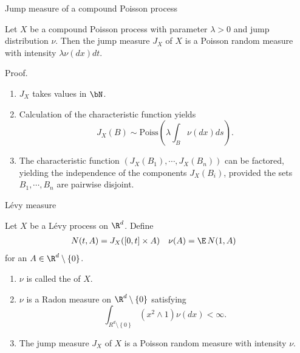 \begin{frame}
    {Jump measure of a compound Poisson process}
    
    \begin{theorem}
        Let $X$ be a compound Poisson process with parameter $\lambda>0$ and jump
        distribution $\nu$. Then the jump measure $J_X$ of $X$ is a Poisson 
        random measure with intensity $\lambda \nu(dx) dt$.
    \end{theorem}

    Proof.
    \begin{enumerate}
        \item $J_X$ takes values in $\bN$.
        \item Calculation of the characteristic function yields
            \begin{equation*}
                J_X (B) \sim \text{Poiss} \left( \lambda \int_{B}^{} \nu(dx) ds \right).
            \end{equation*}
        \item The characteristic function $\left( J_X(B_1), \cdots, J_X(B_n)
            \right)$ can be factored, yielding the independence of the
            components $J_X(B_i)$, provided the sets $B_1, \cdots, B_n$ are
            pairwise disjoint.
    \end{enumerate}
\end{frame}

\begin{frame}
    {L\'evy measure}
    
    Let $X$ be a L\'evy process on $\R^d$. Define
    \begin{align*}
        N(t,A) &= J_X( [0,t] \times A) & \nu(A) &=  \E\, N(1, A)
    \end{align*}
    for an $A\in \R^d \setminus \left\{ 0 \right\}$.

    \begin{enumerate}
        \item $\nu$ is called the  of $X$. 
        \item $\nu$ is a Radon measure on $\R^d \setminus \left\{ 0 \right\}$ satisfying
            \begin{equation*}
                \int_{R^d \setminus \left\{ 0 \right\} } 
                    \left( x^2 \wedge 1 \right) \nu(dx) < \infty.
            \end{equation*}
        \item The jump measure $J_X$ of $X$ is a Poisson random measure with
            intensity $\nu$.  
    \end{enumerate}
\end{frame}

